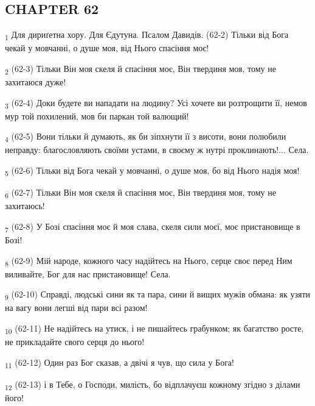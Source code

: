 \subsection{CHAPTER 62}
\begin{tcolorbox}
\textsubscript{1} Для дириґетна хору. Для Єдутуна. Псалом Давидів. (62-2) Тільки від Бога чекай у мовчанні, о душе моя, від Нього спасіння моє!
\end{tcolorbox}
\begin{tcolorbox}
\textsubscript{2} (62-3) Тільки Він моя скеля й спасіння моє, Він твердиня моя, тому не захитаюся дуже!
\end{tcolorbox}
\begin{tcolorbox}
\textsubscript{3} (62-4) Доки будете ви нападати на людину? Усі хочете ви розтрощити її, немов мур той похилений, мов би паркан той валющий!
\end{tcolorbox}
\begin{tcolorbox}
\textsubscript{4} (62-5) Вони тільки й думають, як би зіпхнути її з висоти, вони полюбили неправду: благословляють своїми устами, в своєму ж нутрі проклинають!... Села.
\end{tcolorbox}
\begin{tcolorbox}
\textsubscript{5} (62-6) Тільки від Бога чекай у мовчанні, о душе моя, бо від Нього надія моя!
\end{tcolorbox}
\begin{tcolorbox}
\textsubscript{6} (62-7) Тільки Він моя скеля й спасіння моє, Він твердиня моя, тому не захитаюсь!
\end{tcolorbox}
\begin{tcolorbox}
\textsubscript{7} (62-8) У Бозі спасіння моє й моя слава, скеля сили моєї, моє пристановище в Бозі!
\end{tcolorbox}
\begin{tcolorbox}
\textsubscript{8} (62-9) Мій народе, кожного часу надійтесь на Нього, серце своє перед Ним виливайте, Бог для нас пристановище! Села.
\end{tcolorbox}
\begin{tcolorbox}
\textsubscript{9} (62-10) Справді, людські сини як та пара, сини й вищих мужів обмана: як узяти на вагу вони легші від пари всі разом!
\end{tcolorbox}
\begin{tcolorbox}
\textsubscript{10} (62-11) Не надійтесь на утиск, і не пишайтесь грабунком; як багатство росте, не прикладайте свого серця до нього!
\end{tcolorbox}
\begin{tcolorbox}
\textsubscript{11} (62-12) Один раз Бог сказав, а двічі я чув, що сила у Бога!
\end{tcolorbox}
\begin{tcolorbox}
\textsubscript{12} (62-13) і в Тебе, о Господи, милість, бо відплачуєш кожному згідно з ділами його!
\end{tcolorbox}
